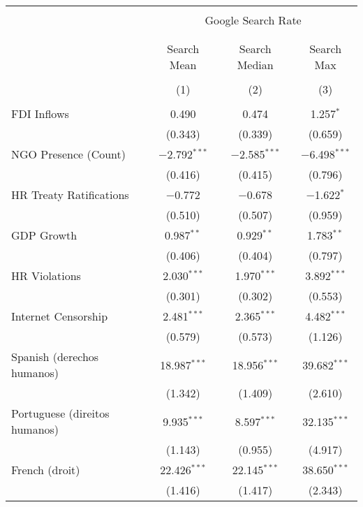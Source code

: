 
\begin{table}[!htbp] \centering 
  \caption{} 
  \label{} 
\begin{tabular}{@{\extracolsep{5pt}}lccc} 
\\[-1.8ex]\hline 
\hline \\[-1.8ex] 
 & \multicolumn{3}{c}{Google Search Rate} \\ 
\cline{2-4} 
\\[-1.8ex] & \multicolumn{3}{c}{ } \\ 
 & Search Mean & Search Median & Search Max \\ 
\\[-1.8ex] & (1) & (2) & (3)\\ 
\hline \\[-1.8ex] 
 FDI Inflows & 0.490 & 0.474 & 1.257$^{*}$ \\ 
  & (0.343) & (0.339) & (0.659) \\ 
  NGO Presence (Count) & $-$2.792$^{***}$ & $-$2.585$^{***}$ & $-$6.498$^{***}$ \\ 
  & (0.416) & (0.415) & (0.796) \\ 
  HR Treaty Ratifications & $-$0.772 & $-$0.678 & $-$1.622$^{*}$ \\ 
  & (0.510) & (0.507) & (0.959) \\ 
  GDP Growth & 0.987$^{**}$ & 0.929$^{**}$ & 1.783$^{**}$ \\ 
  & (0.406) & (0.404) & (0.797) \\ 
  HR Violations & 2.030$^{***}$ & 1.970$^{***}$ & 3.892$^{***}$ \\ 
  & (0.301) & (0.302) & (0.553) \\ 
  Internet Censorship & 2.481$^{***}$ & 2.365$^{***}$ & 4.482$^{***}$ \\ 
  & (0.579) & (0.573) & (1.126) \\ 
  Spanish (derechos humanos) & 18.987$^{***}$ & 18.956$^{***}$ & 39.682$^{***}$ \\ 
  & (1.342) & (1.409) & (2.610) \\ 
  Portuguese (direitos humanos) & 9.935$^{***}$ & 8.597$^{***}$ & 32.135$^{***}$ \\ 
  & (1.143) & (0.955) & (4.917) \\ 
  French (droit) & 22.426$^{***}$ & 22.145$^{***}$ & 38.650$^{***}$ \\ 
  & (1.416) & (1.417) & (2.343) \\ 

\end{tabular}
\end{table}
